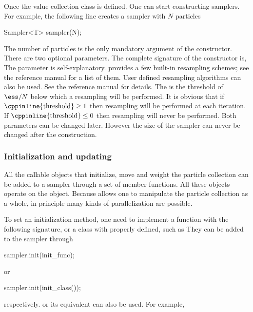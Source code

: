 Once the value collection class  is defined. One can start
constructing \smc samplers. For example, the following line creates a sampler
with $N$ particles
\begin{cppcode}
Sampler<T> sampler(N);
\end{cppcode}
The number of particles is the only mandatory argument of the constructor.
There are two optional parameters. The complete signature of the constructor
is,
The  parameter is self-explanatory. \vsmc provides a few
built-in resampling schemes; see the reference manual for a list of them. User
defined resampling algorithms can also be used. See the reference manual for
details. The  is the threshold of $\ess/N$ below which a
resampling will be performed. It is obvious that if
$\text{\cppinline{threshold}}\ge1$ then resampling will be performed at each
iteration. If $\text{\cppinline{threshold}}\le0$ then resampling will never be
performed. Both parameters can be changed later. However the size of the
sampler can never be changed after the construction.

\subsubsection{Initialization and updating}
\label{ssub:Initialization and updating}

All the callable objects that initialize, move and weight the particle
collection can be added to a sampler through a set of member functions. All
these objects operate on the  object. Because \vsmc
allows one to manipulate the particle collection as a whole, in principle many
kinds of parallelization are possible.

To set an initialization method, one need to implement a function with the
following signature,
or a class with  properly defined, such as
They can be added to the sampler through
\begin{cppcode}
sampler.init(init_func);
\end{cppcode}
or
\begin{cppcode}
sampler.init(init_class());
\end{cppcode}
respectively. \cppoo{}  or its \boost equivalent
 can also be used. For example,

